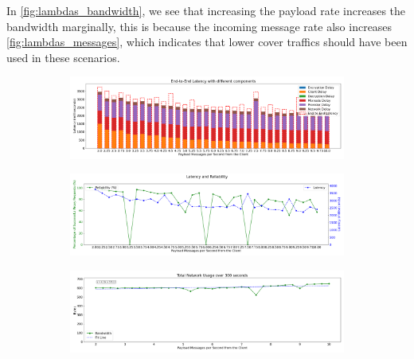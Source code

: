 \documentclass[a4paper,11pt,oneside]{report}
\begin{document}
In \autoref{fig:lambdas_bandwidth}, we see that increasing the payload rate increases the bandwidth marginally, this is because the incoming message rate also increases \autoref{fig:lambdas_messages}, which indicates that lower cover traffics should have been used in these scenarios.

\begin{figure}[H]
    \centering
    \begin{subfigure}{\textwidth}
        \centering
        \includegraphics[width=\textwidth]{plots/lambdas_latency_components.png}
        \caption{}
        \label{fig:lambdas_latency}
    \end{subfigure}
    \hfill
    \centering
    \begin{subfigure}{\textwidth}
        \centering
        \includegraphics[width=\textwidth]{plots/lambdas_reliability_latency.png}
        \caption{}
        \label{fig:lambdas_realibility}
    \end{subfigure}
    \hfill
    \begin{subfigure}{\textwidth}
        \centering
        \includegraphics[width=\textwidth]{plots/lambdas_bandwidth.png}
        \caption{}
        \label{fig:lambdas_bandwidth}
    \end{subfigure}
    \hfill
    \begin{subfigure}{\textwidth}

\end{subfigure}
\end{figure}
\end{document}
